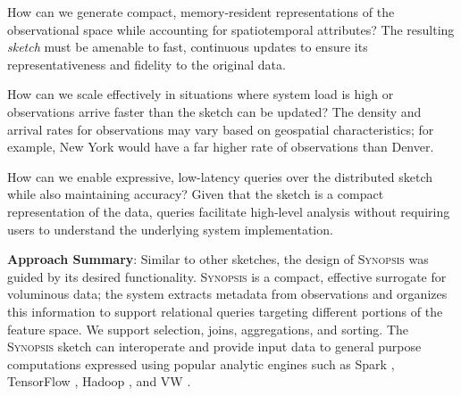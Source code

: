 \documentclass[9pt,journal,compsoc]{IEEEtran}
\begin{document}
\begin{description}[leftmargin=*]
    \item[\emph{RQ-1:}] How can we generate compact, memory-resident representations of the observational space while accounting for spatiotemporal attributes? The resulting \emph{sketch} must be amenable to fast, continuous updates to ensure its representativeness and fidelity to the original data.
    \item[\emph{RQ-2:}] How can we scale effectively in situations where system load is high or observations arrive faster than the sketch can be updated? The density and arrival rates for observations may vary based on geospatial characteristics; for example, New York would have a far higher rate of observations than Denver.
    \item[\emph{RQ-3:}] How can we enable expressive, low-latency queries over the distributed sketch while also maintaining accuracy?  Given that the sketch is a compact representation of the data, queries facilitate high-level analysis without requiring users to understand the underlying system implementation.
\end{description}
%
\vspace{0.7em}
%
\textbf{Approach Summary}:
Similar to other sketches, the design of \textsc{Synopsis} was guided by its desired functionality. \textsc{Synopsis} is a compact, effective surrogate for voluminous data; the system extracts metadata from observations and organizes this information to support relational queries targeting different portions of the feature space. We support selection, joins, aggregations, and sorting. The \textsc{Synopsis} sketch can interoperate and provide input data to general purpose computations expressed using popular analytic engines such as Spark \cite{zaharia2010spark,armbrust2015spark}, TensorFlow \cite{abadi2016tensorflow,tensorflow}, Hadoop \cite{hadoop,shvachko2010hadoop,borthakur2008hdfs}, and VW \cite{langford2007vowpal}.
\end{document}
